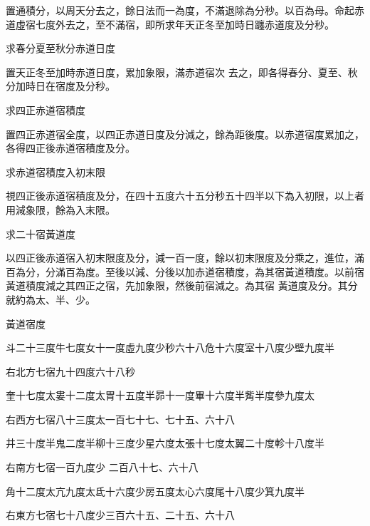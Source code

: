 \begin{pinyinscope}
 置通積分，以周天分去之，餘日法而一為度，不滿退除為分秒。以百為母。命起赤道虛宿七度外去之，至不滿宿，即所求年天正冬至加時日躔赤道度及分秒。



 求春分夏至秋分赤道日度



 置天正冬至加時赤道日度，累加象限，滿赤道宿次
 去之，即各得春分、夏至、秋分加時日在宿度及分秒。



 求四正赤道宿積度



 置四正赤道宿全度，以四正赤道日度及分減之，餘為距後度。以赤道宿度累加之，各得四正後赤道宿積度及分。



 求赤道宿積度入初末限



 視四正後赤道宿積度及分，在四十五度六十五分秒五十四半以下為入初限，以上者用減象限，餘為入末限。



 求二十宿黃道度



 以四正後赤道宿入初末限度及分，減一百一度，餘以初末限度及分乘之，進位，滿百為分，分滿百為度。至後以減、分後以加赤道宿積度，為其宿黃道積度。以前宿黃道積度減之其四正之宿，先加象限，然後前宿減之。為其宿
 黃道度及分。其分就約為太、半、少。



 黃道宿度



 斗二十三度牛七度女十一度虛九度少秒六十八危十六度室十八度少壁九度半



 右北方七宿九十四度六十八秒



 奎十七度太婁十二度太胃十五度半昴十一度畢十六度半觜半度參九度太



 右西方七宿八十三度太一百七十七、七十五、六十八



 井三十度半鬼二度半柳十三度少星六度太張十七度太翼二十度軫十八度半



 右南方七宿一百九度少
 二百八十七、六十八



 角十二度太亢九度太氐十六度少房五度太心六度尾十八度少箕九度半



 右東方七宿七十八度少三百六十五、二十五、六十八




\end{pinyinscope}
